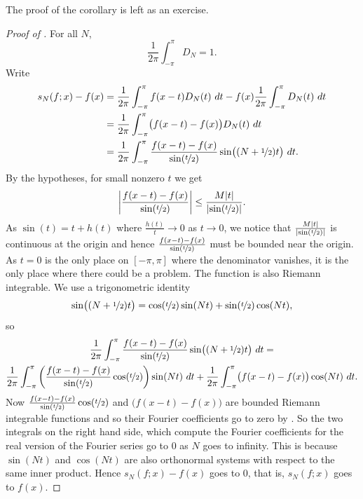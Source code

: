 The proof of the corollary is left as an exercise.

\begin{proof}[Proof of ]
For all $N$,
\begin{equation*}
\frac{1}{2\pi} \int_{-\pi}^\pi D_N = 1 .
\end{equation*}
Write
\begin{equation*}
\begin{split}
s_N(f;x)-f(x) & =
\frac{1}{2\pi} \int_{-\pi}^\pi f(x-t) D_N(t) ~ dt 
-
f(x)
\frac{1}{2\pi} \int_{-\pi}^\pi D_N(t) ~ dt
\\
& = 
\frac{1}{2\pi} \int_{-\pi}^\pi \bigl( f(x-t) - f(x) \bigr) D_N(t) ~ dt 
\\
& = 
\frac{1}{2\pi} \int_{-\pi}^\pi \frac{f(x-t) - f(x)}{\sin(\nicefrac{t}{2})} \sin\bigl(
(N+\nicefrac{1}{2})t \bigr) ~ dt .
\end{split}
\end{equation*}
By the hypotheses,
for small nonzero $t$ we get
\begin{equation*}
\left\lvert { \frac{f(x-t) - f(x)}{\sin(\nicefrac{t}{2})} } \right\rvert
\leq
\frac{M\lvert {t} \rvert}{\lvert {\sin(\nicefrac{t}{2})} \rvert} .
\end{equation*}
As $\sin(t) = t + h(t)$ where $\frac{h(t)}{t} \to 0$ as $t \to 0$,
we notice that
$\frac{M\lvert {t} \rvert}{\lvert {\sin(\nicefrac{t}{2})} \rvert}$ is continuous at the origin
and hence 
$\frac{f(x-t) - f(x)}{\sin(\nicefrac{t}{2})}$ must be bounded near the origin.
As $t=0$ is the only place on $[-\pi,\pi]$ where the denominator vanishes,
it is the only place where there could be a problem.  The function is
also Riemann integrable.  We use a trigonometric identity
\begin{equation*}
\sin\bigl( (N+\nicefrac{1}{2})t \bigr)
=
\cos(\nicefrac{t}{2}) \sin(Nt) + 
\sin(\nicefrac{t}{2}) \cos(Nt) ,
\end{equation*}
so
\begin{multline*}
\frac{1}{2\pi} \int_{-\pi}^\pi \frac{f(x-t) - f(x)}{\sin(\nicefrac{t}{2})} \sin\bigl(
(N+\nicefrac{1}{2})t \bigr) ~ dt 
= \\
\frac{1}{2\pi} \int_{-\pi}^\pi
\left( \frac{f(x-t) - f(x)}{\sin(\nicefrac{t}{2})}
\cos (\nicefrac{t}{2}) \right) \sin (Nt) ~ dt
+
\frac{1}{2\pi} \int_{-\pi}^\pi \bigl( f(x-t) - f(x) \bigr)
\cos (Nt) ~ dt .
\end{multline*}
Now 
$\frac{f(x-t) - f(x)}{\sin(\nicefrac{t}{2})} \cos (\nicefrac{t}{2})$
and
$\bigl( f(x-t) - f(x) \bigr)$ are bounded Riemann integrable functions
and so their Fourier coefficients go to zero by .  So the two
integrals on the right hand side, which compute the Fourier coefficients
for the real version of the Fourier series go to 0 as $N$ goes to infinity.
This is because $\sin(Nt)$ and $\cos(Nt)$ are also orthonormal systems
with respect to the same inner product.
Hence $s_N(f;x)-f(x)$ goes to 0, that is, $s_N(f;x)$ goes to $f(x)$.
\end{proof}


